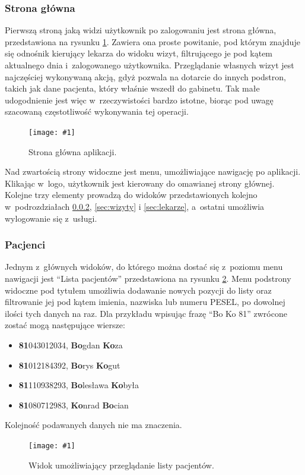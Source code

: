 \documentclass[11pt]{aghdpl}
\newcommand{\fullWidthPicture}[2]{
\begin{figure}[h!]
	\centering
		\texttt{[image: \#1]}
	\caption{#2}
	\label{fig:#1}
\end{figure}
}
\begin{document}
\subsubsection{Strona główna}

Pierwszą stroną jaką widzi użytkownik po zalogowaniu jest strona główna, przedstawiona na rysunku \ref{fig:home}. Zawiera ona proste powitanie, pod którym znajduje się odnośnik kierujący lekarza do widoku wizyt, filtrującego je pod kątem aktualnego dnia i~zalogowanego użytkownika. Przeglądanie własnych wizyt jest najczęściej wykonywaną akcją, gdyż pozwala na dotarcie do innych podstron, takich jak dane pacjenta, który właśnie wszedł do gabinetu. Tak małe udogodnienie jest więc w~rzeczywistości bardzo istotne, biorąc pod uwagę szacowaną częstotliwość wykonywania tej operacji.

\fullWidthPicture{home}{Strona główna aplikacji.}

Nad zwartością strony widoczne jest menu, umożliwiające nawigację po aplikacji. Klikając w~logo, użytkownik jest kierowany do omawianej strony głównej. Kolejne trzy elementy prowadzą do widoków przedstawionych kolejno w~podrozdziałach \ref{sec:pacjenci}, \ref{sec:wizyty} i \ref{sec:lekarze}, a~ostatni umożliwia wylogowanie się z~usługi.

\subsubsection{Pacjenci}
\label{sec:pacjenci}

Jednym z~głównych widoków, do którego można dostać się z~poziomu menu nawigacji jest ``Lista pacjentów'' przedstawiona na rysunku \ref{fig:pacjenci}. Menu podstrony widoczne pod tytułem umożliwia dodawanie nowych pozycji do listy oraz filtrowanie jej pod kątem imienia, nazwiska lub numeru PESEL, po dowolnej ilości tych danych na raz. Dla przykładu wpisując frazę ``Bo Ko 81'' zwrócone zostać mogą następujące wiersze:
\begin{itemize}
	\item \textbf{81}043012034, \textbf{Bo}gdan \textbf{Ko}za
	\item \textbf{81}012184392, \textbf{Bo}rys \textbf{Ko}gut
	\item \textbf{81}110938293, \textbf{Bo}lesława \textbf{Ko}była
	\item \textbf{81}080712983, \textbf{Ko}nrad \textbf{Bo}cian
\end{itemize}
Kolejność podawanych danych nie ma znaczenia.

\fullWidthPicture{pacjenci}{Widok umożliwiający przeglądanie listy pacjentów.}
\end{document}
